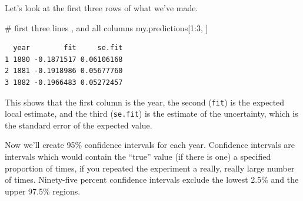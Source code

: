 \documentclass[
  letterpaper,
  DIV=11,
  numbers=noendperiod]{scrreprt}
\newenvironment{Shaded}{\begin{snugshade}}{\end{snugshade}}
\newcommand{\AttributeTok}[1]{\textcolor[rgb]{0.40,0.45,0.13}{#1}}
\newcommand{\CommentTok}[1]{\textcolor[rgb]{0.37,0.37,0.37}{#1}}
\newcommand{\ConstantTok}[1]{\textcolor[rgb]{0.56,0.35,0.01}{#1}}
\newcommand{\DecValTok}[1]{\textcolor[rgb]{0.68,0.00,0.00}{#1}}
\newcommand{\DocumentationTok}[1]{\textcolor[rgb]{0.37,0.37,0.37}{\textit{#1}}}
\newcommand{\FunctionTok}[1]{\textcolor[rgb]{0.28,0.35,0.67}{#1}}
\newcommand{\NormalTok}[1]{\textcolor[rgb]{0.00,0.23,0.31}{#1}}
\newcommand{\OtherTok}[1]{\textcolor[rgb]{0.00,0.23,0.31}{#1}}
\newcommand{\SpecialCharTok}[1]{\textcolor[rgb]{0.37,0.37,0.37}{#1}}
\newcommand{\StringTok}[1]{\textcolor[rgb]{0.13,0.47,0.30}{#1}}
\begin{document}
\begin{Shaded}
\end{Shaded}

Let's look at the first three rows of what we've made.

\begin{Shaded}
\begin{Highlighting}[]
\CommentTok{\# first three lines , and all columns}
\NormalTok{my.predictions[}\DecValTok{1}\SpecialCharTok{:}\DecValTok{3}\NormalTok{, ]}
\end{Highlighting}
\end{Shaded}

\begin{verbatim}
  year        fit     se.fit
1 1880 -0.1871517 0.06106168
2 1881 -0.1918986 0.05677760
3 1882 -0.1966483 0.05272457
\end{verbatim}

This shows that the first column is the year, the second (\texttt{fit})
is the expected local estimate, and the third (\texttt{se.fit}) is the
estimate of the uncertainty, which is the standard error of the expected
value.

Now we'll create 95\% confidence intervals for each year. Confidence
intervals are intervals which would contain the ``true'' value (if there
is one) a specified proportion of times, if you repeated the experiment
a really, really large number of times. Ninety-five percent confidence
intervals exclude the lowest 2.5\% and the upper 97.5\% regions.
\end{document}
